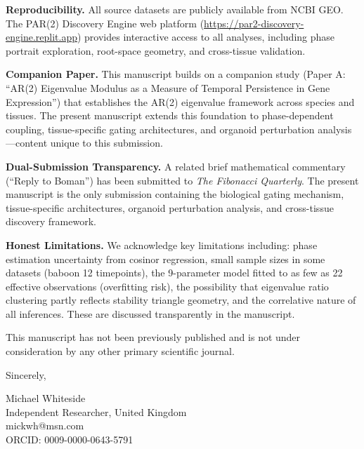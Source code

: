 \documentclass[11pt,letterpaper]{article}
\begin{document}
\vspace{0.3cm}

\textbf{Reproducibility.} All source datasets are publicly available from NCBI GEO. The PAR(2) Discovery Engine web platform (\url{https://par2-discovery-engine.replit.app}) provides interactive access to all analyses, including phase portrait exploration, root-space geometry, and cross-tissue validation.

\vspace{0.3cm}

\textbf{Companion Paper.} This manuscript builds on a companion study (Paper A: ``AR(2) Eigenvalue Modulus as a Measure of Temporal Persistence in Gene Expression'') that establishes the AR(2) eigenvalue framework across species and tissues. The present manuscript extends this foundation to phase-dependent coupling, tissue-specific gating architectures, and organoid perturbation analysis---content unique to this submission.

\vspace{0.3cm}

\textbf{Dual-Submission Transparency.} A related brief mathematical commentary (``Reply to Boman'') has been submitted to \textit{The Fibonacci Quarterly}. The present manuscript is the only submission containing the biological gating mechanism, tissue-specific architectures, organoid perturbation analysis, and cross-tissue discovery framework.

\vspace{0.3cm}

\textbf{Honest Limitations.} We acknowledge key limitations including: phase estimation uncertainty from cosinor regression, small sample sizes in some datasets (baboon 12 timepoints), the 9-parameter model fitted to as few as 22 effective observations (overfitting risk), the possibility that eigenvalue ratio clustering partly reflects stability triangle geometry, and the correlative nature of all inferences. These are discussed transparently in the manuscript.

\vspace{0.3cm}

This manuscript has not been previously published and is not under consideration by any other primary scientific journal.

\vspace{0.5cm}

Sincerely,

\vspace{0.5cm}

Michael Whiteside \\
Independent Researcher, United Kingdom \\
mickwh@msn.com \\
ORCID: 0009-0000-0643-5791
\end{document}
